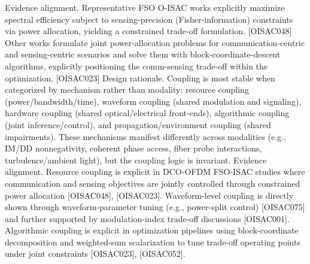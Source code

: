 {}Evidence alignment. Representative FSO O-ISAC works explicitly maximize spectral efficiency subject to sensing-precision (Fisher-information) constraints via power allocation, yielding a constrained trade-off formulation. [O\markdownRendererUnderscore{}ISAC\markdownRendererUnderscore{}048] \markdownRendererSoftLineBreak
{}Other works formulate joint power-allocation problems for communication-centric and sensing-centric scenarios and solve them with block-coordinate-descent algorithms, explicitly positioning the comm-sensing trade-off within the optimization. [O\markdownRendererUnderscore{}ISAC\markdownRendererUnderscore{}023] \markdownRendererInterblockSeparator
{}
\markdownRendererSectionEnd \markdownRendererSectionBegin
{}\markdownRendererInterblockSeparator
{}Design rationale. Coupling is most stable when categorized by mechanism rather than modality: resource coupling (power/bandwidth/time), waveform coupling (shared modulation and signaling), hardware coupling (shared optical/electrical front-ends), algorithmic coupling (joint inference/control), and propagation/environment coupling (shared impairments). These mechanisms manifest differently across modalities (e.g., IM/DD nonnegativity, coherent phase access, fiber probe interactions, turbulence/ambient light), but the coupling logic is invariant.\markdownRendererParagraphSeparator
{}Evidence alignment. Resource coupling is explicit in DCO-OFDM FSO-ISAC studies where communication and sensing objectives are jointly controlled through constrained power allocation [O\markdownRendererUnderscore{}ISAC\markdownRendererUnderscore{}048], [O\markdownRendererUnderscore{}ISAC\markdownRendererUnderscore{}023].\markdownRendererSoftLineBreak
{}Waveform-level coupling is directly shown through waveform-parameter tuning (e.g., power-split control) [O\markdownRendererUnderscore{}ISAC\markdownRendererUnderscore{}075] and further supported by modulation-index trade-off discussions [O\markdownRendererUnderscore{}ISAC\markdownRendererUnderscore{}001].\markdownRendererSoftLineBreak
{}Algorithmic coupling is explicit in optimization pipelines using block-coordinate decomposition and weighted-sum scalarization to tune trade-off operating points under joint constraints [O\markdownRendererUnderscore{}ISAC\markdownRendererUnderscore{}023], [O\markdownRendererUnderscore{}ISAC\markdownRendererUnderscore{}052].\markdownRendererSoftLineBreak
